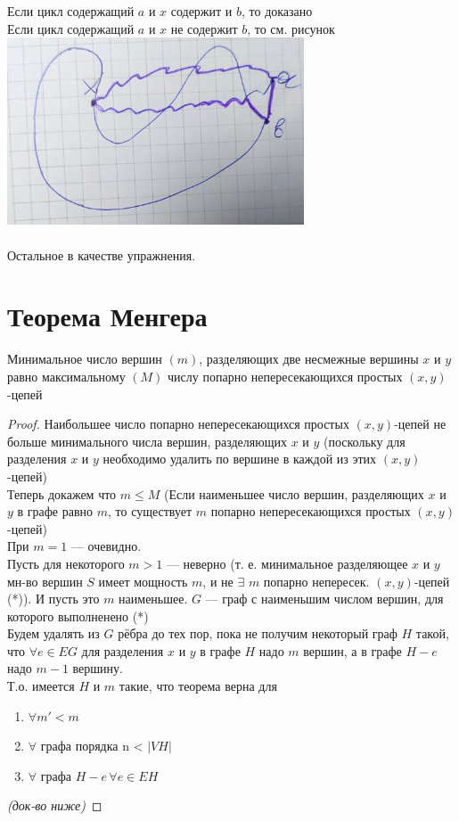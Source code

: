 \documentclass[12pt]{article}
\begin{document}
			Если цикл содержащий $a$ и $x$ содержит и $b$, то доказано\\
			Если цикл содержащий $a$ и $x$ не содержит $b$, то см. рисунок\\
			\includegraphics[width=250pt]{1}\\
		\\
		Остальное в качестве упражнения.\\
	\qedsymbol

\section{Теорема Менгера}
		Минимальное число вершин $(m)$, разделяющих две несмежные вершины $x$ и $y$ равно максимальному $(M)$ числу попарно непересекающихся простых $(x,y)$-цепей
	\begin{proof}
		Наибольшее число попарно непересекающихся простых $(x, y)$-цепей не больше минимального числа вершин, разделяющих $x$ и $y$ (поскольку для разделения $x$ и $y$ необходимо удалить по вершине в каждой из этих $(x,y)$-цепей)\\
		Теперь докажем что $m \leqslant M$ 
		(Если наименьшее число вершин, разделяющих $x$ и $y$ в графе равно $m$, то существует $m$ попарно непересекающихся простых $(x,y)$-цепей)\\
		При $m=1$ — очевидно.\\
		Пусть для некоторого $m > 1$ — неверно (т. е. минимальное разделяющее $x$ и $y$ мн-во вершин $S$ имеет мощность $m$, и не $\exists$ $m$ попарно непересек. $(x,y)$-цепей (*)). И пусть это $m$ наименьшее. $G$ — граф с наименьшим числом вершин, для которого выполненено (*)\\
		Будем удалять из $G$ рёбра до тех пор, пока не получим некоторый граф $H$ такой, что $\forall e \in EG$ для разделения $x$ и $y$ в графе $H$ надо $m$ вершин, а в графе $H-e$ надо $m-1$ вершину.\\
		Т.о. имеется $H$ и $m$ такие, что теорема верна для
		\begin{enumerate}
			\item $\forall m' < m$
			\item $\forall$ графа порядка n < $|VH|$
			\item $\forall$ графа $H-e \, \forall e \in EH$
		\end{enumerate}
		\textit{(док-во ниже)}
	\end{proof}
\end{document}
